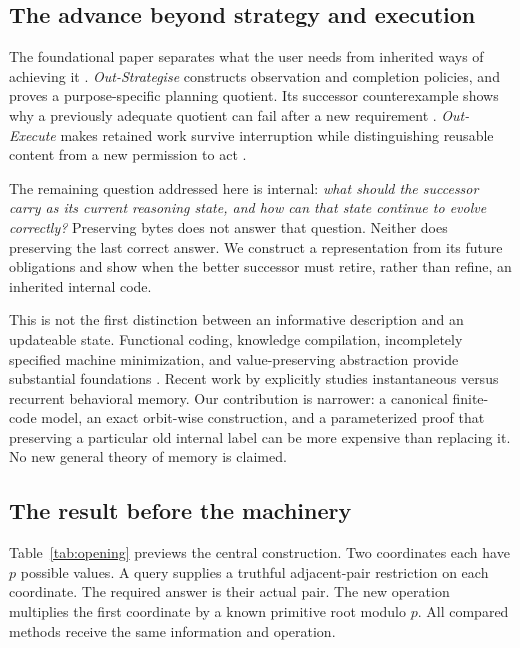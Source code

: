 \documentclass[11pt,letterpaper]{article}
\theoremstyle{remark}\newtheorem{remark}{Remark}[section]
\begin{document}
\subsection{The advance beyond strategy and execution}
The foundational paper separates what the user needs from inherited ways of achieving it \citep{boucherTI}. \emph{Out-Strategise} constructs observation and completion policies, and proves a purpose-specific planning quotient. Its successor counterexample shows why a previously adequate quotient can fail after a new requirement \citep{boucherStrategy}. \emph{Out-Execute} makes retained work survive interruption while distinguishing reusable content from a new permission to act \citep{boucherExecute}.

The remaining question addressed here is internal: \emph{what should the successor carry as its current reasoning state, and how can that state continue to evolve correctly?} Preserving bytes does not answer that question. Neither does preserving the last correct answer. We construct a representation from its future obligations and show when the better successor must retire, rather than refine, an inherited internal code.

This is not the first distinction between an informative description and an updateable state. Functional coding, knowledge compilation, incompletely specified machine minimization, and value-preserving abstraction provide substantial foundations \citep{orlitsky,doshi,darwiche,kam,pena,givan}. Recent work by \citet{li2026} explicitly studies instantaneous versus recurrent behavioral memory. Our contribution is narrower: a canonical finite-code model, an exact orbit-wise construction, and a parameterized proof that preserving a particular old internal label can be more expensive than replacing it. No new general theory of memory is claimed.

\subsection{The result before the machinery}
Table~\ref{tab:opening} previews the central construction. Two coordinates each have $p$ possible values. A query supplies a truthful adjacent-pair restriction on each coordinate. The required answer is their actual pair. The new operation multiplies the first coordinate by a known primitive root modulo $p$. All compared methods receive the same information and operation.
\end{document}
